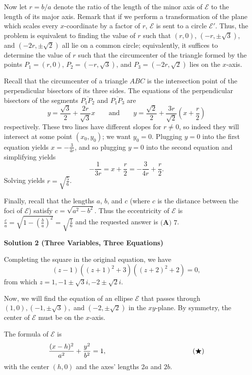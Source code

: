 \begin{enumerate}
 Now let $r=b/a$ denote the ratio of the length of the minor axis of $\mathcal E$ to the length of its major axis. Remark that if we perform a transformation of the plane which scales every $x$-coordinate by a factor of $r$, $\mathcal E$ is sent to a circle $\mathcal E'$. Thus, the problem is equivalent to finding the value of $r$ such that $(r,0)$, $\left(-r,\pm\sqrt 3\right)$, and $\left(-2r,\pm\sqrt 2\right)$ all lie on a common circle; equivalently, it suffices to determine the value of $r$ such that the circumcenter of the triangle formed by the points $P_1 = (r,0)$, $P_2 = \left(-r,\sqrt 3\right)$, and $P_3 = \left(-2r,\sqrt 2\right)$ lies on the $x$-axis.

 Recall that the circumcenter of a triangle $ABC$ is the intersection point of the perpendicular bisectors of its three sides. The equations of the perpendicular bisectors of the segments $\overline{P_1P_2}$ and $\overline{P_1P_3}$ are
 \[y = \frac{\sqrt 3}2 + \frac{2r}{\sqrt 3}x\qquad\text{and}\qquad y = \frac{\sqrt 2}2 + \frac{3r}{\sqrt 2}\left(x + \frac r2\right)\]respectively. These two lines have different slopes for $r\neq 0$, so indeed they will intersect at some point $(x_0,y_0)$; we want $y_0 = 0$. Plugging $y = 0$ into the first equation yields $x = -\frac{3}{4r}$, and so plugging $y=0$ into the second equation and simplifying yields
 \[-\frac{1}{3r} = x + \frac r2 = -\frac{3}{4r} + \frac{r}{2}.\]Solving yields $r=\sqrt{\frac 56}$.

 Finally, recall that the lengths $a$, $b$, and $c$ (where $c$ is the distance between the foci of $\mathcal E$) satisfy $c = \sqrt{a^2 - b^2}$. Thus the eccentricity of $\mathcal E$ is $\frac ca = \sqrt{1 - \left(\frac ba\right)^2} = \sqrt{\frac 16}$ and the requested answer is $\boxed{\textbf{(A) } 7}$.

 



\textbf{Solution 2 (Three Variables, Three Equations)}

Completing the square in the original equation, we have 
 \[(z-1)\left((z+1)^2+3\right)\left((z+2)^2+2\right)=0,\] from which $z=1,-1\pm\sqrt{3}i,-2\pm\sqrt{2}i.$

 Now, we will find the equation of an ellipse $\mathcal E$ that passes through $(1,0),\left(-1,\pm\sqrt3\right),$ and $\left(-2,\pm\sqrt2\right)$ in the $xy$-plane. By symmetry, the center of $\mathcal E$ must be on the $x$-axis.

 The formula of $\mathcal E$ is 
 \[\frac{(x-h)^2}{a^2}+\frac{y^2}{b^2}=1, \hspace{44.5mm} (\bigstar)\] with the center $(h,0)$ and the axes' lengths $2a$ and $2b.$


\end{enumerate}

